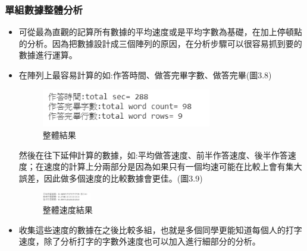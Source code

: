 \subsubsection{單組數據整體分析}
\begin{itemize}
	\item 可從最為直觀的記算所有數據的平均速度或是平均字數為基礎，在加上停頓點的分析。因為把數據設計成三個陣列的原因，在分析步驟可以很容易抓到要的數據進行運算。
	\item 在陣列上最容易計算的如:作答時間、做答完畢字數、做答完畢(圖3.8)
	\begin{figure}[H] 
		\centering 
		\includegraphics[width=0.7\textwidth]{3_8.png} 
		\caption{整體結果} 
		\label{Fig.3.8} 
	\end{figure}
	然後在往下延伸計算的數據，如:平均做答速度、前半作答速度、後半作答速度；在速度的計算上分兩部分是因為如果只有一個均速可能在比較上會有集大誤差，因此做多個速度的比較數據會更佳。(圖3.9)
	\begin{figure}[H] 
		\centering 
		\includegraphics[width=0.2\textwidth]{3_9.png} 
		\caption{整體速度結果} 
		\label{Fig.3.9} 
	\end{figure}
	\item 收集這些速度的數據在之後比較多組，也就是多個同學更能知道每個人的打字速度，除了分析打字的字數外速度也可以加入進行細部分的分析。
\end{itemize}
